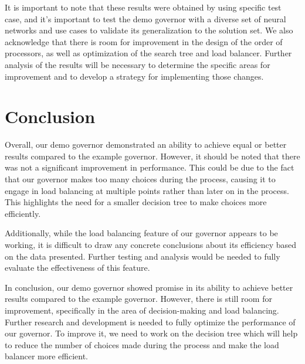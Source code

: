\documentclass[a4paper, 12pt, fleqn]{article}
\begin{document}
It is important to note that these results were obtained by using specific test case, and it's important to test the demo governor with a diverse set of neural networks and use cases to validate its generalization to the solution set. We also acknowledge that there is room for improvement in the design of the order of processors, as well as optimization of the search tree and load balancer. Further analysis of the results will be necessary to determine the specific areas for improvement and to develop a strategy for implementing those changes.


\section{Conclusion}
Overall, our demo governor demonstrated an ability to achieve equal or better results compared to the example governor. However, it should be noted that there was not a significant improvement in performance. This could be due to the fact that our governor makes too many choices during the process, causing it to engage in load balancing at multiple points rather than later on in the process. This highlights the need for a smaller decision tree to make choices more efficiently.

Additionally, while the load balancing feature of our governor appears to be working, it is difficult to draw any concrete conclusions about its efficiency based on the data presented. Further testing and analysis would be needed to fully evaluate the effectiveness of this feature.

In conclusion, our demo governor showed promise in its ability to achieve better results compared to the example governor. However, there is still room for improvement, specifically in the area of decision-making and load balancing. Further research and development is needed to fully optimize the performance of our governor. To improve it, we need to work on the decision tree which will help to reduce the number of choices made during the process and make the load balancer more efficient.
\end{document}

